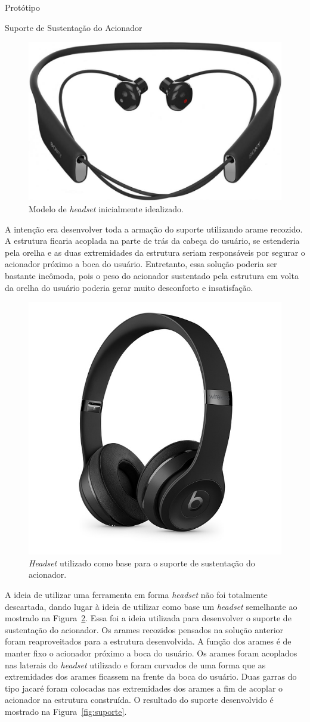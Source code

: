 \begin{chapter}{Protótipo}
\begin{section}{Suporte de Sustentação do Acionador}
\begin{figure}[!h]
	\centering
	\begin{minipage}[c]{\textwidth}
	\centering
	\includegraphics[width=0.3\linewidth]{fig/heaset}
	\caption{Modelo de \textit{headset} inicialmente idealizado.}
	\label{fig:headset}
	\end{minipage}
\end{figure} 

A intenção era desenvolver toda a armação do suporte utilizando arame recozido.
A estrutura ficaria acoplada na parte de trás da cabeça do usuário, se estenderia
pela orelha e as duas extremidades da estrutura seriam responsáveis por segurar
o acionador próximo a boca do usuário. Entretanto, essa solução poderia ser
bastante incômoda, pois o peso do acionador sustentado pela estrutura em volta
da orelha do usuário poderia gerar muito desconforto e insatisfação.

 
\begin{figure}[!h]
	\centering
	\begin{minipage}[c]{\textwidth}
	\centering
	\includegraphics[width=0.35\linewidth]{fig/fone}
	\caption{\textit{Headset} utilizado como base para o suporte de sustentação
do acionador.}
	\label{fig:fone}
	\end{minipage}
\end{figure}


A ideia de utilizar uma ferramenta em forma \textit{headset} não foi totalmente
descartada, dando lugar à ideia de utilizar como base um \textit{headset}
semelhante ao mostrado na Figura~\ref{fig:fone}. 
Essa foi a ideia utilizada para desenvolver o suporte de sustentação do
acionador. Os arames recozidos pensados na solução anterior foram reaproveitados
para a estrutura desenvolvida. A função dos arames é de manter fixo o acionador
próximo a boca do usuário. Os arames foram acoplados nas laterais do
\textit{headset} utilizado e foram curvados de uma forma que as extremidades
dos arames ficassem na frente da boca do usuário. Duas garras do tipo jacaré
foram colocadas nas extremidades  dos arames a fim de acoplar o acionador na
estrutura construída. O resultado do suporte desenvolvido é mostrado na
Figura~\ref{fig:suporte}. 


\end{section}
\end{chapter}
